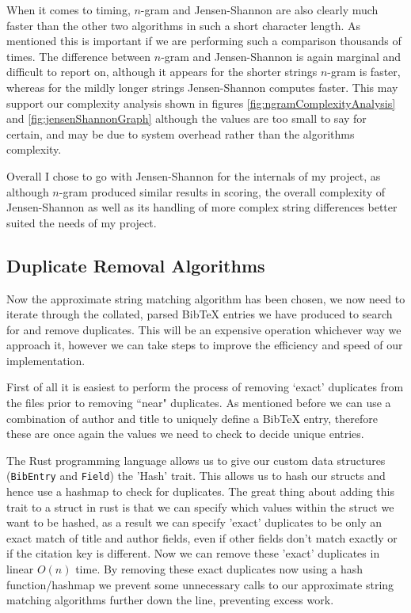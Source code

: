 \documentclass[a4paper,11pt]{article}
\newcommand{\code}[1]{\colorbox{codegray}{\texttt{#1}}}
\begin{document}
When it comes to timing, $n$-gram and Jensen-Shannon are also clearly much faster than the other two algorithms in such a short character length. As mentioned this is important if we are performing such a comparison thousands of times. The difference between $n$-gram and Jensen-Shannon is again marginal and difficult to report on, although it appears for the shorter strings $n$-gram is faster, whereas for the mildly longer strings Jensen-Shannon computes faster. This may support our complexity analysis shown in figures \ref{fig:ngramComplexityAnalysis} and \ref{fig:jensenShannonGraph} although the values are too small to say for certain, and may be due to system overhead rather than the algorithms complexity.

Overall I chose to go with Jensen-Shannon for the internals of my project, as although $n$-gram produced similar results in scoring, the overall complexity of Jensen-Shannon as well as its handling of more complex string differences better suited the needs of my project.

\subsection{Duplicate Removal Algorithms}
Now the approximate string matching algorithm has been chosen, we now need to iterate through the collated, parsed BibTeX entries we have produced to search for and remove duplicates. This will be an expensive operation whichever way we approach it, however we can take steps to improve the efficiency and speed of our implementation.

First of all it is easiest to perform the process of removing `exact' duplicates from the files prior to removing ``near"  duplicates. As mentioned before we can use a combination of author and title to uniquely define a BibTeX entry, therefore these are once again the values we need to check to decide unique entries.

The Rust programming language allows us to give our custom data structures (\code{BibEntry} and \code{Field}) the 'Hash' trait. This allows us to hash our structs and hence use a hashmap to check for duplicates. The great thing about adding this trait to a struct in rust is that we can specify which values within the struct we want to be hashed, as a result we can specify 'exact' duplicates to be only an exact match of title and author fields, even if other fields don't match exactly or if the citation key is different. Now we can remove these 'exact' duplicates in linear $O(n)$ time. By removing these exact duplicates now using a hash function/hashmap we prevent some unnecessary calls to our approximate string matching algorithms further down the line, preventing excess work.
\end{document}
